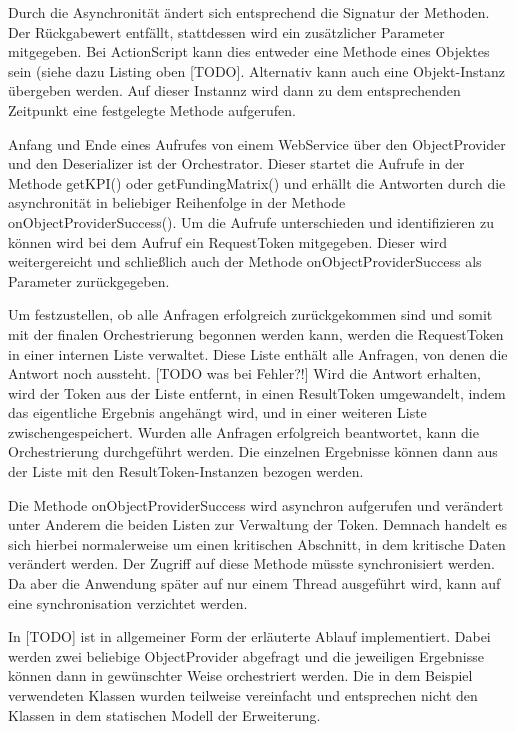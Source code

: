 Durch die Asynchronität ändert sich entsprechend die Signatur der Methoden. Der Rückgabewert entfällt, stattdessen wird ein zusätzlicher Parameter mitgegeben. Bei ActionScript kann dies entweder eine Methode eines Objektes sein (siehe dazu Listing oben [TODO]. Alternativ kann auch eine Objekt-Instanz übergeben werden. Auf dieser Instannz wird dann zu dem entsprechenden Zeitpunkt eine festgelegte Methode aufgerufen.

Anfang und Ende eines Aufrufes von einem WebService über den ObjectProvider und den Deserializer ist der Orchestrator. Dieser startet die Aufrufe in der Methode getKPI() oder getFundingMatrix() und erhällt die Antworten durch die asynchronität in beliebiger Reihenfolge in der Methode onObjectProviderSuccess(). Um die Aufrufe unterschieden und identifizieren zu können wird bei dem Aufruf ein RequestToken mitgegeben. Dieser wird weitergereicht und schließlich auch der Methode onObjectProviderSuccess als Parameter zurückgegeben.

Um festzustellen, ob alle Anfragen erfolgreich zurückgekommen sind und somit mit der finalen Orchestrierung begonnen werden kann, werden die RequestToken in einer internen Liste verwaltet. Diese Liste enthält alle Anfragen, von denen die Antwort noch aussteht. [TODO was bei Fehler?!] Wird die Antwort erhalten, wird der Token aus der Liste entfernt, in einen ResultToken umgewandelt, indem das eigentliche Ergebnis angehängt wird, und in einer weiteren Liste zwischengespeichert. Wurden alle Anfragen erfolgreich beantwortet, kann die Orchestrierung durchgeführt werden. Die einzelnen Ergebnisse können dann aus der Liste mit den ResultToken-Instanzen bezogen werden.

Die Methode onObjectProviderSuccess wird asynchron aufgerufen und verändert unter Anderem die beiden Listen zur Verwaltung der Token. Demnach handelt es sich hierbei normalerweise um einen kritischen Abschnitt, in dem kritische Daten verändert werden. Der Zugriff auf diese Methode müsste synchronisiert werden. Da aber die Anwendung später auf nur einem Thread ausgeführt wird, kann auf eine synchronisation verzichtet werden. %

In [TODO] ist in allgemeiner Form der erläuterte Ablauf implementiert. Dabei werden zwei beliebige ObjectProvider abgefragt und die jeweiligen Ergebnisse können dann in gewünschter Weise orchestriert werden. Die in dem Beispiel verwendeten Klassen wurden teilweise vereinfacht und entsprechen nicht den Klassen in dem statischen Modell der Erweiterung.

